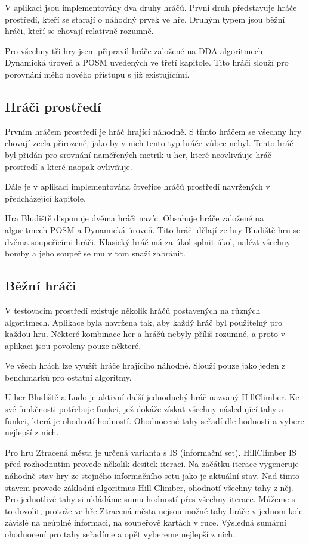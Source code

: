 V aplikaci jsou implementovány dva druhy hráčů. První druh představuje hráče prostředí, kteří se starají o náhodný prvek ve hře. Druhým typem jsou běžní hráči, kteří se chovají relativně rozumně.

Pro všechny tři hry jsem připravil hráče založené na DDA algoritmech Dynamická úroveň a POSM uvedených ve třetí kapitole. Tito hráči slouží pro porovnání mého nového přístupu s již existujícími.

\subsection{Hráči prostředí}

Prvním hráčem prostředí je hráč hrající náhodně. S tímto hráčem se všechny hry chovají zcela přirozeně, jako by v nich tento typ hráče vůbec nebyl. Tento hráč byl přidán pro srovnání naměřených metrik u her, které neovlivňuje hráč prostředí a které naopak ovlivňuje.

Dále je v aplikaci implementována čtveřice hráčů prostředí navržených v předcházející kapitole.

Hra Bludiště disponuje dvěma hráči navíc. Obsahuje hráče založené na algoritmech POSM a Dynamická úroveň. Tito hráči dělají ze hry Bludiště hru se dvěma soupeřícími hráči. Klasický hráč má za úkol splnit úkol, nalézt všechny bomby a jeho soupeř se mu v tom snaží zabránit. 

\subsection{Běžní hráči}

V testovacím prostředí existuje několik hráčů postavených na různých algoritmech. Aplikace byla navržena tak, aby každý hráč byl použitelný pro každou hru. Některé kombinace her a hráčů nebyly příliš rozumné, a proto v aplikaci jsou povoleny pouze některé.

Ve všech hrách lze využít hráče hrajícího náhodně. Slouží pouze jako jeden z benchmarků pro ostatní algoritmy.

U her Bludiště a Ludo je aktivní další jednoduchý hráč nazvaný HillClimber. Ke své funkčnosti potřebuje funkci, jež dokáže získat všechny následující tahy a funkci, která je ohodnotí hodností. Ohodnocené tahy seřadí dle hodnosti a vybere nejlepší z nich.

Pro hru Ztracená města je určená varianta s IS (informační set). HillClimber IS před rozhodnutím provede několik desítek iterací. Na začátku iterace vygeneruje náhodně stav hry ze stejného informačního setu jako je aktuální stav. Nad tímto stavem provede základní algoritmus Hill Climber, ohodnotí všechny tahy z něj. Pro jednotlivé tahy si ukládáme sumu hodností přes všechny iterace. Můžeme si to dovolit, protože ve hře Ztracená města nejsou možné tahy hráče v jednom kole závislé na neúplné informaci, na soupeřově kartách v ruce. Výsledná sumární ohodnocení pro tahy seřadíme a opět vybereme nejlepší z nich.

